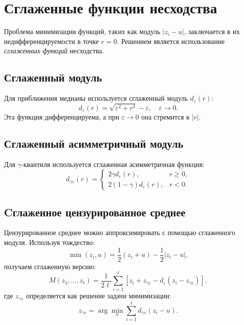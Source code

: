 \section*{Сглаженные функции несходства}
Проблема минимизации функций, таких как модуль $|z_i - u|$, заключается в их недифференцируемости в точке $r = 0$. Решением является использование \textit{сглаженных функций} несходства.

\subsection*{Сглаженный модуль}
Для приближения медианы используется сглаженный модуль $d_\varepsilon(r)$:
\begin{equation}
    d_\varepsilon(r) = \sqrt{\varepsilon^2 + r^2} - \varepsilon, \quad \varepsilon \to 0.
\end{equation}
Эта функция дифференцируема, а при $\varepsilon \to 0$ она стремится к $|r|$.

\subsection*{Сглаженный асимметричный модуль}
Для $\gamma$-квантиля используется сглаженная асимметричная функция:
\begin{equation}
    d_{\gamma\varepsilon}(r) = \begin{cases}
        2\gamma d_\varepsilon(r),       & r \geq 0, \\
        2(1 - \gamma) d_\varepsilon(r), & r < 0.
    \end{cases}
\end{equation}

\subsection*{Cглаженное цензурированное среднее}
Цензурированное среднее можно аппроксимировать с помощью сглаженного модуля. Используя тождество:
\begin{equation}
    \min(z_i, u) = \frac{1}{2}(z_i + u) - \frac{1}{2}|z_i - u|,
\end{equation}
получаем сглаженную версию:
\begin{equation}
    M(z_1, \dots, z_\ell) = \frac{1}{2\ell} \sum_{i=1}^\ell \left[ z_i + z_{\gamma\varepsilon} - d_\varepsilon(z_i - z_{\gamma\varepsilon}) \right],
\end{equation}
где $z_{\gamma\varepsilon}$ определяется как решение задачи минимизации:
\begin{equation}
    z_{\gamma\varepsilon} = \arg \min_u \sum_{i=1}^\ell d_{\gamma\varepsilon}(z_i - u).
\end{equation}

